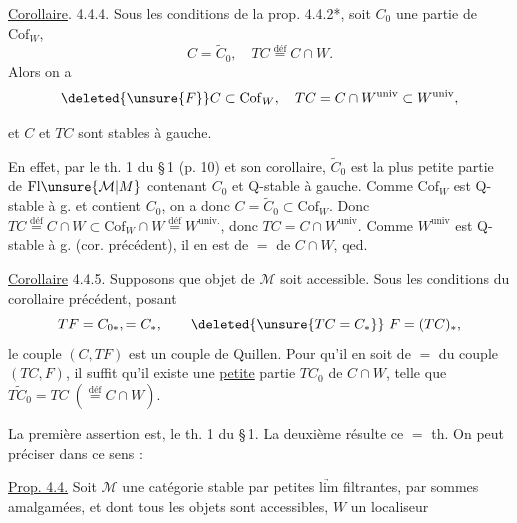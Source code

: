 \uline{Corollaire}. 4.4.4. Sous les conditions de
la prop. 4.4.2\deleted{\unsure{,}}*,   soit $C_0$ une  partie de $\mathrm{Cof}_W$,
\[
 C=\widetilde C_0,\quad TC\overset{\mathrm{déf}}{=}C\cap W.
\]
Alors on a
\[
 \deleted{\unsure{F}}C\subset\mathrm{Cof}_W,\quad TC=C\cap W^{\mathrm{univ}}\subset W^{\mathrm{univ}},
\]


 et $C$ et $TC$ sont stables à gauche.

En effet, par le th. 1 du \S\,1 (p. 10) et
son corollaire, $\widetilde C_0$ est la plus petite partie
de $\mathrm{Fl}\unsure{\mathcal M|M}$ contenant $C_0$ et Q-stable à gauche.
Comme $\mathrm{Cof}_W$ \deleted{$\unsure{\subset}$} est Q-stable à g. et contient
$C_0$, on a donc $C=\widetilde C_0\subset\mathrm{Cof}_W$. Donc
$TC\overset{\mathrm{déf}}{=}C\cap W\subset\mathrm{Cof}_W\cap W\overset{\mathrm{déf}}{=}W^{\mathrm{univ.}}$,
 donc $TC=C\cap W^{\mathrm{univ}}$. Comme
$W^{\mathrm{univ}}$ est  Q-stable à g. (cor. précédent), il
en est de $=$ de $C\cap W$, qed.

\uline{Corollaire} 4.4.5. Supposons que  objet de
$\mathcal M$ soit accessible. Sous les conditions du
corollaire précédent,  posant
\[
 TF=C_{0*},=C_*,\qquad \deleted{\unsure{TC=C_*}}\ F=(TC)_*,
\]
le couple $(C,TF)$ est un couple de
Quillen. Pour qu'il en soit de $=$
du couple $(TC,F)$, il suffit qu'il
existe une \uline{petite} partie $TC_0$ de $C\cap W$,
telle que $\widetilde{TC_0}=TC\;(\overset{\mathrm{déf}}{=}C\cap W)$.

La première assertion est,  le th. 1 du
\S\,1.  La deuxième résulte  ce $=$
th. On peut préciser dans ce sens :

\uline{Prop. 4.4.} Soit $\mathcal M$ une catégorie stable par petites
$\underrightarrow{\mathrm{lim}}$ filtrantes, par sommes amalgamées, et dont
tous les objets sont accessibles, $W$ un localiseur


